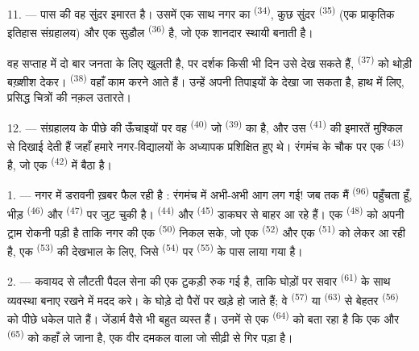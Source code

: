 11. --- पास की वह सुंदर इमारत  है। उसमें एक साथ नगर का
 \textsuperscript{(34)}, कुछ सुंदर
 \textsuperscript{(35)} (एक प्राकृतिक इतिहास
संग्रहालय) और एक सुडौल  \textsuperscript{(36)} है, जो एक शानदार
स्थायी  बनाती है।

वह सप्ताह में दो बार जनता के लिए खुलती है, पर दर्शक किसी भी दिन उसे देख सकते हैं,
 \textsuperscript{(37)} को थोड़ी बख़्शीश देकर। 
\textsuperscript{(38)} वहाँ काम करने आते हैं। उन्हें अपनी तिपाइयों के
 देखा जा सकता है, हाथ में  लिए, प्रसिद्ध चित्रों
की नक़ल उतारते।

12. --- संग्रहालय के पीछे की ऊँचाइयों पर वह 
\textsuperscript{(40)} जो  \textsuperscript{(39)} का है, और उस
 \textsuperscript{(41)} की इमारतें मुश्किल से
दिखाई देती हैं जहाँ हमारे नगर-विद्यालयों के अध्यापक प्रशिक्षित हुए थे। रंगमंच के
चौक पर एक  \textsuperscript{(43)} है, जो एक 
\textsuperscript{(42)} में बैठा है।

\VUsaut{5.0mm}
\VUsaut{3.0mm}

\VUsaut{3.4mm}

1. --- नगर में डरावनी ख़बर फैल रही है : रंगमंच में अभी-अभी आग लग गई! जब तक मैं
 \textsuperscript{(96)} पहुँचता हूँ, भीड़ 
\textsuperscript{(46)} और  \textsuperscript{(47)} पर जुट चुकी है।
 \textsuperscript{(44)} और  \textsuperscript{(45)}
डाकघर से बाहर आ रहे हैं। एक  \textsuperscript{(48)} को अपनी
ट्राम रोकनी पड़ी है ताकि नगर की एक  \textsuperscript{(50)}
निकल सके, जो एक  \textsuperscript{(52)} और एक
 \textsuperscript{(51)} को लेकर आ रही है, एक 
\textsuperscript{(53)} की देखभाल के लिए, जिसे  \textsuperscript{(54)}
पर  \textsuperscript{(55)} के पास लाया गया है।

2. --- कवायद से लौटती पैदल सेना की एक टुकड़ी रुक गई है, ताकि घोड़ों पर सवार
 \textsuperscript{(61)} के साथ व्यवस्था बनाए रखने में मदद करे।
 के घोड़े दो पैरों पर खड़े हो जाते हैं; वे 
\textsuperscript{(57)} या  \textsuperscript{(63)} से बेहतर
 \textsuperscript{(56)} को पीछे धकेल पाते हैं। जेंडार्म वैसे भी
बहुत व्यस्त हैं। उनमें से एक  \textsuperscript{(64)} को
बता रहा है कि एक और  \textsuperscript{(65)} को कहाँ ले जाना है, एक
वीर दमकल वाला जो सीढ़ी से गिर पड़ा है।

